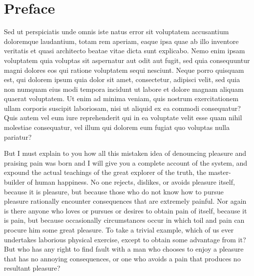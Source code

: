 \chapter*{Preface}

Sed ut perspiciatis unde omnis iste natus error sit voluptatem accusantium
doloremque laudantium, totam rem aperiam, eaque ipsa quae ab illo inventore
veritatis et quasi architecto beatae vitae dicta sunt explicabo. Nemo enim
ipsam voluptatem quia voluptas sit aspernatur aut odit aut fugit, sed quia
consequuntur magni dolores eos qui ratione voluptatem sequi nesciunt. Neque
porro quisquam est, qui dolorem ipsum quia dolor sit amet, consectetur,
adipisci velit, sed quia non numquam eius modi tempora incidunt ut labore et
dolore magnam aliquam quaerat voluptatem. Ut enim ad minima veniam, quis nostrum
exercitationem ullam corporis suscipit laboriosam, nisi ut aliquid ex ea
commodi consequatur? Quis autem vel eum iure reprehenderit qui in ea voluptate
velit esse quam nihil molestiae consequatur, vel illum qui dolorem eum fugiat
quo voluptas nulla pariatur?


But I must explain to you how all this mistaken idea of denouncing pleasure
and praising pain was born and I will give you a complete account of the
system, and expound the actual teachings of the great explorer of the truth,
the master-builder of human happiness. No one rejects, dislikes, or avoids
pleasure itself, because it is pleasure, but because those who do not know how
to pursue pleasure rationally encounter consequences that are extremely painful.
Nor again is there anyone who loves or pursues or desires to obtain pain of
itself, because it is pain, but because occasionally circumstances occur in
which toil and pain can procure him some great pleasure. To take a trivial
example, which of us ever undertakes laborious physical exercise, except to
obtain some advantage from it? But who has any right to find fault with a man
who chooses to enjoy a pleasure that has no annoying consequences, or one who
avoids a pain that produces no resultant pleasure?
